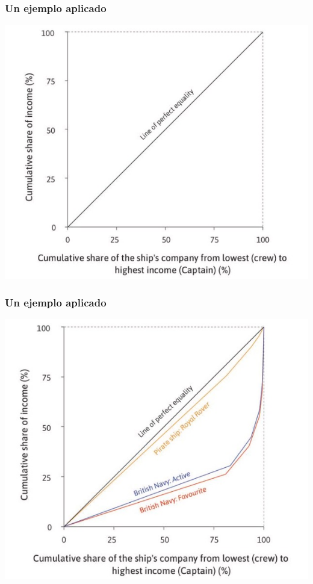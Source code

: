 \documentclass{beamer}
\begin{document}
\begin{frame} 
\frametitle{Un ejemplo aplicado}
    \begin{center}    
    \includegraphics[scale=0.55]{../Tema_04.16_lorenz1.jpg}
    \end{center}
\end{frame}

\begin{frame} 
\frametitle{Un ejemplo aplicado}
    \begin{center}    
    \includegraphics[scale=0.55]{../Tema_04.17_lorenz2.jpg}
    \end{center}
\end{frame}
\end{document}
